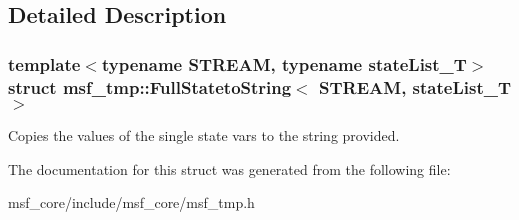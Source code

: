 \subsection{Detailed Description}
\subsubsection*{template$<$typename S\-T\-R\-E\-A\-M, typename state\-List\-\_\-\-T$>$struct msf\-\_\-tmp\-::\-Full\-Stateto\-String$<$ S\-T\-R\-E\-A\-M, state\-List\-\_\-\-T $>$}

Copies the values of the single state vars to the string provided. 

The documentation for this struct was generated from the following file\-:\begin{DoxyCompactItemize}
\item 
msf\-\_\-core/include/msf\-\_\-core/msf\-\_\-tmp.\-h\end{DoxyCompactItemize}
